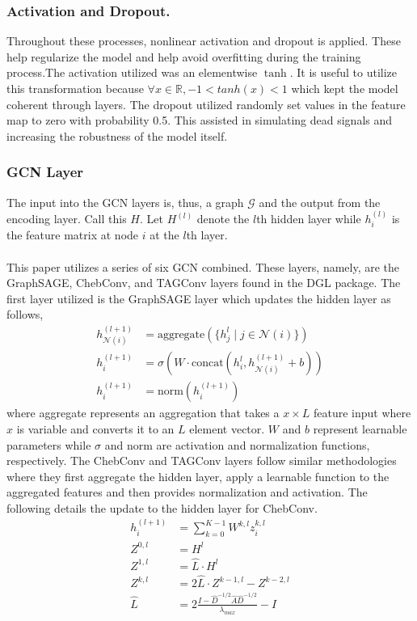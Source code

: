 \subsubsection{Activation and Dropout.}
Throughout these processes, nonlinear activation and dropout is applied. These help regularize the model and help avoid overfitting during the training process.The activation utilized was an elementwise $\tanh$. It is useful to utilize this transformation because $\forall x \in \mathbb{R}, -1 < tanh(x) < 1$ which kept the model coherent through layers. The dropout utilized randomly set values in the feature map to zero with probability 0.5. This assisted in simulating dead signals and increasing the robustness of the model itself.

\subsubsection{GCN Layer}
The input into the GCN layers is, thus, a graph $\mathcal{G}$ and the output from the encoding layer. Call this $H$. Let $H^{(l)}$ denote the $l$th hidden layer while $h_i^{(l)}$ is the feature matrix at node $i$ at the $l$th layer. \\\\
This paper utilizes a series of six GCN combined. These layers, namely, are the GraphSAGE, ChebConv, and  TAGConv layers found in the DGL package. The first layer utilized is the GraphSAGE layer which updates the hidden layer as follows,
\begin{align*}
    h_{\mathcal{N}(i)}^{(l+1)} &= \text{aggregate}(\{h_j^l \mid j \in \mathcal{N}(i)\}) \\
    h_{i}^{(l+1)} &= \sigma\left(W \cdot \text{concat} (h_i^l, h_{\mathcal{N}(i)}^{(l+1)} + b)\right) \\
    h_{i}^{(l+1)} &= \text{norm}(h_{i}^{(l+1)})
\end{align*}
where aggregate represents an aggregation that takes a $x \times L$ feature input where $x$ is variable and converts it to an $L$ element vector. $W$ and $b$ represent learnable parameters while $\sigma$ and norm are activation and normalization functions, respectively. The ChebConv and TAGConv layers follow similar methodologies where they first aggregate the hidden layer, apply a learnable function to the aggregated features and then provides normalization and activation. The following details the update to the hidden layer for ChebConv.
\begin{align*}
    h_i^{(l+1)} &= \sum_{k = 0}^{K-1}W^{k,l}z_i^{k,l} \\
    Z^{0,l} &= H^l \\
    Z^{1,l} &= \hat{L} \cdot H^l \\
    Z^{k,l} &= 2\hat{L}\cdot Z^{k-1, l} - Z^{k-2, l} \\
    \hat{L} &= 2 \frac{I - \hat{D}^{-1/2}\hat{A}\hat{D}^{-1/2}}{\lambda_{max}} - I
\end{align*}
